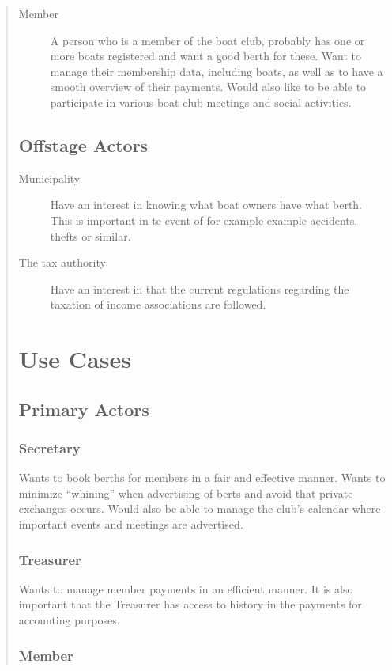 \begin{quote}
\begin{description}
  \item[Member]
  A person who is a member of the boat club, probably has one or more boats
  registered and want a good berth for these. Want to manage their membership
  data, including boats, as well as to have a smooth overview of their
  payments.  Would also like to be able to participate in various boat club
  meetings and social activities.
\end{description}

\subsection{Offstage Actors}
\begin{description}
  \item[Municipality]
  Have an interest in knowing what boat owners have what berth. This is
  important in te event of for example example accidents, thefts or similar.
  
  \item[The tax authority]
  Have an interest in that the current regulations regarding the taxation of
  income associations are followed.
\end{description}


\section{Use Cases}
\subsection{Primary Actors}
\subsubsection{Secretary}\label{secretary}
Wants to book berths for members in a fair and effective manner. Wants
to minimize ``whining'' when advertising of berts and avoid that private
exchanges occurs. Would also be able to manage the club's calendar where
important events and meetings are advertised.

\subsubsection{Treasurer}\label{treasurer}

Wants to manage member payments in an efficient manner. It is also
important that the Treasurer has access to history in the payments for
accounting purposes.

\subsubsection{Member}\label{member}


\end{quote}
